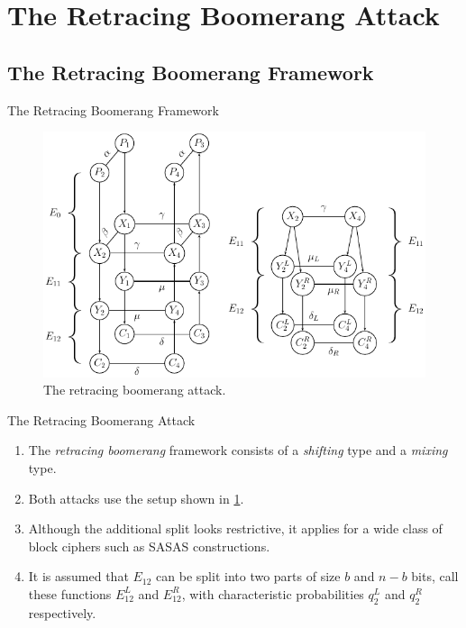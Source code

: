 \documentclass[notheorems]{beamer}
\theoremstyle{definition}
\theoremstyle{example}
\begin{document}
    \section[Retracing Boomerang Attack]{The Retracing Boomerang Attack}
    \label{sec:retr-boomerang}
    
    \subsection{The Retracing Boomerang Framework}
    \label{sec:retr-framework}

    \begin{frame}{The Retracing Boomerang Framework}
        \begin{figure}[!ht]
            \centering
            \includegraphics[width=0.6\columnwidth]{images/retracing_boomerang.png}
            \caption{The retracing boomerang attack.}
            \label{fig:retr-boomerang}
        \end{figure}
    \end{frame}

    \begin{frame}[<+->]{The Retracing Boomerang Attack}
        \begin{enumerate}
            \item The \emph{retracing boomerang} framework consists of a
            \emph{shifting} type and a \emph{mixing} type.
            \item Both attacks use the setup shown in \cref{fig:retr-boomerang}.
            \item Although the additional split looks restrictive, it applies
            for a wide class of block ciphers such as SASAS constructions.
            \item It is assumed that \(E_{12}\) can be split into two parts of
            size \(b\) and \(n - b\) bits, call these functions \(E_{12}^L\) and
            \(E_{12}^R\), with characteristic probabilities \(q_2^L\) and
            \(q_2^R\) respectively.
        \end{enumerate}
    \end{frame}
\end{document}
